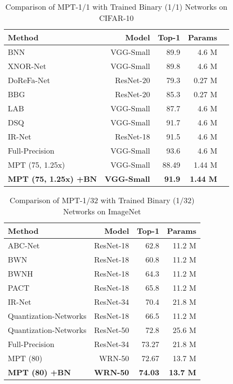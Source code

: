 \documentclass{article} \usepackage{iclr2021_conference,times}
\begin{document}
\begin{table*}
\centering
\begin{small}
\begin{tabular}{@{}lrrrr@{}}\toprule
\textbf{Method} & \textbf{Model} & \textbf{Top-1} & \textbf{Params} \\ \midrule
BNN & VGG-Small & 89.9 & 4.6 M \\ \hdashline
XNOR-Net & VGG-Small & 89.8 & 4.6 M \\ \hdashline
DoReFa-Net & ResNet-20 & 79.3 & 0.27 M \\ \hdashline
BBG & ResNet-20 & 85.3 & 0.27 M \\ \hdashline
LAB & VGG-Small & 87.7 & 4.6 M \\ \hdashline
DSQ & VGG-Small & 91.7 & 4.6 M \\ \hdashline
IR-Net & ResNet-18 & 91.5 & 4.6 M \\ \hdashline
{Full-Precision} & VGG-Small & 93.6 & 4.6 M \\ \hline
MPT (75, 1.25x) & VGG-Small & 88.49 & 1.44 M \\ \hdashline
\textbf{MPT (75, 1.25x) +BN} & \textbf{VGG-Small} & \textbf{91.9} & \textbf{1.44 M} \\
\bottomrule
\end{tabular}
\end{small}
\caption{Comparison of MPT-1/1 with Trained Binary (1/1) Networks on CIFAR-10}
\label{table:app-cifar-mpt-1-1}
\end{table*} 





\begin{table*}[!t] 
\centering
\begin{small}
\begin{tabular}{@{}lrrr@{}}\toprule
\textbf{Method} & \textbf{Model} & \textbf{Top-1} & \textbf{Params} \\ \midrule
ABC-Net & ResNet-18 & 62.8 & 11.2 M \\ \hdashline
BWN & ResNet-18 & 60.8 & 11.2 M \\ \hdashline
BWNH & ResNet-18 & 64.3 & 11.2 M \\ \hdashline
PACT & ResNet-18 & 65.8 & 11.2 M \\ \hdashline
IR-Net & ResNet-34 & 70.4 & 21.8 M \\ \hdashline
Quantization-Networks & ResNet-18 & 66.5 & 11.2 M \\ \hdashline
Quantization-Networks & ResNet-50 & 72.8 & 25.6 M \\ \hdashline
Full-Precision & ResNet-34 & 73.27 & 21.8 M \\ \hline
MPT (80) & WRN-50 & 72.67 & 13.7 M \\ \hdashline
\textbf{MPT (80) +BN} &
\textbf{WRN-50} & \textbf{74.03} & \textbf{13.7 M} \\
\bottomrule
\end{tabular}
\end{small}
\caption{Comparison of MPT-1/32 with Trained Binary (1/32) Networks on ImageNet}
\label{table:app-imagenet-mpt-1-32}
\end{table*}
\end{document}
